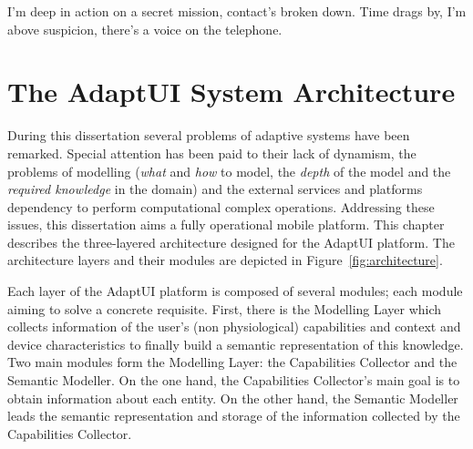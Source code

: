 
\begin{savequote}[50mm]
I'm deep in action on a secret mission, contact's broken down.
Time drags by, I'm above suspicion, there's a voice on the telephone.

\end{savequote}


\chapter{The AdaptUI System Architecture}
\label{cha:architecture}

\ifpdf
    \graphicspath{{4_system_architecture/figures/PNG/}{4_system_architecture/figures/PDF/}{4_system_architecture/figures/}}
\else
    \graphicspath{{4_system_architecture/figures/EPS/}{4_system_architecture/figures/}}
\fi

During this dissertation several problems of adaptive systems have been remarked.
Special attention has been paid to their lack of dynamism, the problems of 
modelling (\textit{what} and \textit{how} to model, the \textit{depth} of the 
model and the \textit{required knowledge} in the domain) and the external 
services and platforms dependency to perform computational complex operations. 
Addressing these issues, this dissertation aims a fully operational mobile 
platform. This chapter describes the three-layered architecture designed for 
the AdaptUI platform. The architecture layers and their modules are depicted in 
Figure~\ref{fig:architecture}.

Each layer of the AdaptUI platform is composed of several modules; each module
aiming to solve a concrete requisite. First, there is the Modelling Layer which
collects information of the user's (non physiological) capabilities and context
and device characteristics to finally build a semantic representation of this
knowledge. Two main modules form the Modelling Layer: the Capabilities Collector
and the Semantic Modeller. On the one hand, the Capabilities Collector's main
goal is to obtain information about each entity. On the other hand, the Semantic
Modeller leads the semantic representation and storage of the information
collected by the Capabilities Collector.


